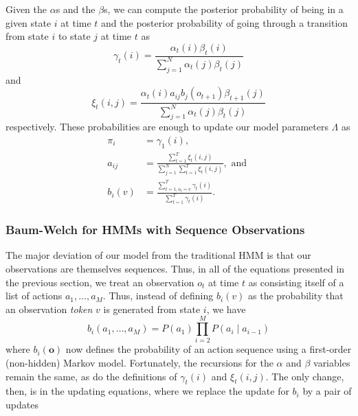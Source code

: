 Given the $\alpha$s and the $\beta$s, we can compute the posterior
probability of being in a given state $i$ at time $t$ and the posterior
probability of going through a transition from state $i$ to state $j$ at
time $t$ as
\begin{equation}
  \gamma_t(i) = \frac{\alpha_t(i)\beta_t(i)}{\sum_{j=1}^N
  \alpha_t(j)\beta_t(j)}
\end{equation}
and
\begin{equation}
  \xi_t(i,j) = \frac{\alpha_t(i)a_{ij} b_j(o_{t+1}) \beta_{t+1}(j)}
  {\sum_{j=1}^N \alpha_t(j)\beta_t(j)}
\end{equation}
respectively. These probabilities are enough to update our model parameters
$\Lambda$ as
\begin{align}
  \pi_i &= \gamma_1(i),\\
  a_{ij} &= \frac{\sum_{t=1}^T \xi_t(i,j)}{\sum_{j=1}^N \sum_{t=1}^T
  \xi_t(i,j)}, \text{ and }\\
  b_i(v) &= \frac{\sum_{t=1, o_t = v}^T \gamma_t(i)}
  {\sum_{t=1}^T \gamma_t(i)}.
\end{align}


\subsubsection{Baum-Welch for HMMs with Sequence Observations}
The major deviation of our model from the traditional HMM is that our
observations are themselves sequences. Thus, in all of the equations
presented in the previous section, we treat an observation $o_t$ at time
$t$ as consisting itself of a list of actions $a_1, \ldots, a_M$. Thus,
instead of defining $b_i(v)$ as the probability that an observation
\emph{token} $v$ is generated from state $i$, we have
\begin{equation}
  b_i(a_1, \ldots, a_M) = P(a_1) \prod_{i=2}^M P(a_i \mid a_{i-1})
\end{equation}
where $b_i(\mathbf{o})$ now defines the probability of an action sequence
using a first-order (non-hidden) Markov model. Fortunately, the recursions
for the $\alpha$ and $\beta$ variables remain the same, as do the
definitions of $\gamma_t(i)$ and $\xi_t(i,j)$. The only change, then, is in
the updating equations, where we replace the update for $b_i$ by a pair of
updates

